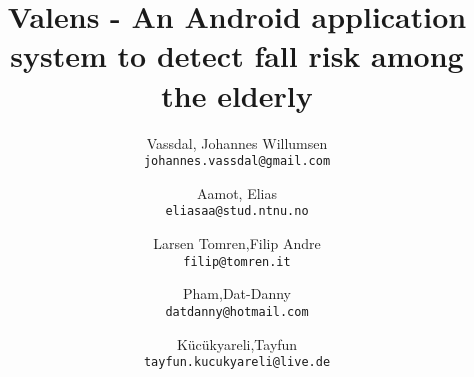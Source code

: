 \documentclass[12pt,a4paper,table]{report}
\title{\TitleFont Valens - An Android application system to detect fall risk among the elderly}
\author{
  Vassdal, Johannes Willumsen\\
  \texttt{johannes.vassdal@gmail.com}
  \and
  Aamot, Elias\\
  \texttt{eliasaa@stud.ntnu.no}
  \and
  Larsen Tomren,Filip Andre\\
  \texttt{filip@tomren.it}
    \and
  Pham,Dat-Danny\\
  \texttt{datdanny@hotmail.com}
    \and
  K\"{u}c\"{u}kyareli,Tayfun\\
  \texttt{tayfun.kucukyareli@live.de}
}
\begin{document}
\onehalfspacing
\maketitle
\tableofcontents












\end{document}
